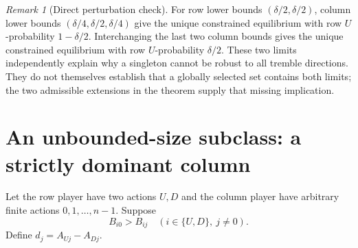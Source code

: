 \documentclass[11pt]{article}
\theoremstyle{definition}
\theoremstyle{remark}
\newtheorem{remark}[theorem]{Remark}
\begin{document}
\begin{remark}[Direct perturbation check]
For row lower bounds $(\delta/2,\delta/2)$, column lower bounds
$(\delta/4,\delta/2,\delta/4)$ give the unique constrained equilibrium
with row $U$-probability $1-\delta/2$. Interchanging the last two column
bounds gives the unique constrained equilibrium with row $U$-probability
$\delta/2$. These two limits independently explain why a singleton
cannot be robust to all tremble directions. They do not themselves
establish that a globally selected set contains both limits; the two
admissible extensions in the theorem supply that missing implication.
\end{remark}


\section{An unbounded-size subclass: a strictly dominant column}
Let the row player have two actions $U,D$ and the column player have
arbitrary finite actions $0,1,\ldots,n-1$. Suppose
\begin{equation}\label{eq:dominant}
 B_{i0}>B_{ij}\quad(i\in\{U,D\},\ j\ne0).
\end{equation}
Define $d_j=A_{Uj}-A_{Dj}$.
\end{document}

